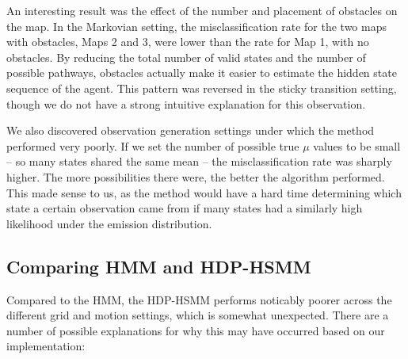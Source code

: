\documentclass{article}
\begin{document}
An interesting result was the effect of the number and placement of obstacles on the map. In the Markovian setting, the misclassification rate for the two maps with obstacles, Maps 2 and 3, were lower than the rate for Map 1, with no obstacles. By reducing the total number of valid states and the number of possible pathways, obstacles actually make it easier to estimate the hidden state sequence of the agent. This pattern was reversed in the sticky transition setting, though we do not have a strong intuitive explanation for this observation.

We also discovered observation generation settings under which the method performed very poorly. If we set the number of possible true $\mu$ values to be small -- so many states shared the same mean -- the misclassification rate was sharply higher. The more possibilities there were, the better the algorithm performed. This made sense to us, as the method would have a hard time determining which state a certain observation came from if many states had a similarly high likelihood under the emission distribution.

\subsection{Comparing HMM and HDP-HSMM}

Compared to the HMM, the HDP-HSMM performs noticably poorer across the different grid and motion settings, which is somewhat unexpected. There are a number of possible explanations for why this may have occurred based on our implementation:
\end{document}
